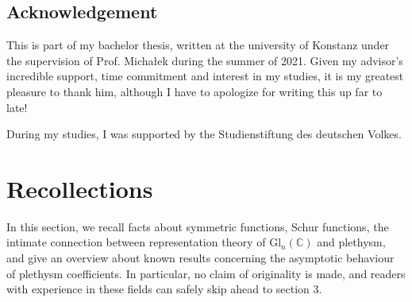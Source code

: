 \documentclass[a4paper]{amsart}
\def\C{{\mathbb{C}}}
\begin{document}
\subsection*{Acknowledgement}
This is part of my bachelor thesis, written at the university of Konstanz under the supervision of Prof. Micha\l{}ek during the summer of 2021.
Given my advisor's incredible support, time commitment and interest in my studies, it is my greatest pleasure to thank him, although I have to apologize for writing this up far to late!

During my studies, I was supported by the Studienstiftung des deutschen Volkes.

\section{Recollections}
In this section, we recall facts about symmetric functions, Schur functions, the intimate connection between representation theory of $\mathrm{Gl}_n(\C)$ and plethysm, and give an overview about known results concerning the asymptotic behaviour of plethysm coefficients.
In particular, no claim of originality is made, and readers with experience in these fields can safely skip ahead to section 3.
\end{document}
